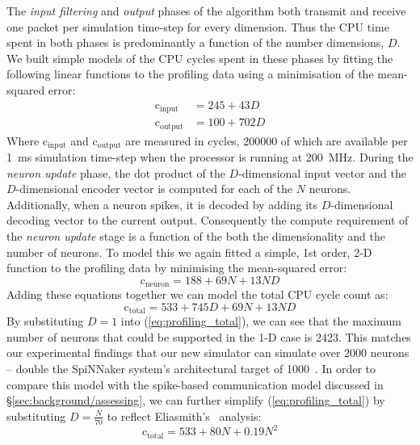 \documentclass[conference]{IEEEtran}
\begin{document}
The \textit{input filtering} and \textit{output} phases of the algorithm both transmit and receive one packet per simulation time-step for every dimension.
Thus the CPU time spent in both phases is predominantly a function of the number dimensions, $D$.
We built simple models of the CPU cycles spent in these phases by fitting the following linear functions to the profiling data using a minimisation of the mean-squared error:
%
\begin{align}
  \mathrm{c}_\mathrm{input} & = 245 + 43 D \label{eq:profiling_input}\\
  \mathrm{c}_\mathrm{output} & = 100 + 702 D \label{eq:profiling_output}
\end{align}
%
Where $\mathrm{c}_\mathrm{input}$ and $\mathrm{c}_\mathrm{output}$ are measured in cycles, \num{200000} of which are available per \SI{1}{\milli\second} simulation time-step when the processor is running at \SI{200}{\mega\hertz}.
During the \textit{neuron update} phase, the dot product of the $D$-dimensional input vector and the $D$-dimensional encoder vector is computed for each of the $N$ neurons.
Additionally, when a neuron spikes, it is decoded by adding its $D$-dimensional decoding vector to the current output.
Consequently the compute requirement of the \textit{neuron update} stage is a function of the both the dimensionality and the number of neurons.
To model this we again fitted a simple, 1st order, 2-D function to the profiling data by minimising the mean-squared error:
%
\begin{equation}
  \mathrm{c}_\mathrm{neuron} = 188 + 69 N + 13 N D\label{eq:profiling_neuron}
\end{equation}
%
Adding these equations together we can model the total CPU cycle count as:
%
\begin{equation}
  \mathrm{c}_\mathrm{total} = 533 + 745 D + 69 N + 13 N D\label{eq:profiling_total}
\end{equation}
%
By substituting $D=1$ into (\ref{eq:profiling_total}), we can see that the maximum number of neurons that could be supported in the 1-D case is 2423. This matches our experimental findings that our new simulator can simulate over 2000 neurons -- double the SpiNNaker system's architectural target of 1000~\parencite{Furber2007}. 
In order to compare this model with the spike-based communication model discussed in \S\ref{sec:background/assessing}, we can further simplify (\ref{eq:profiling_total}) by substituting $D=\frac{N}{70}$ to reflect Eliasmith's~\parencite{eliasmith2013build} analysis:
%
\begin{equation}
  \mathrm{c}_\mathrm{total} = 533 + 80 N + 0.19 N^{2}\label{eq:profiling_total_eliasmith}
\end{equation}
\end{document}
